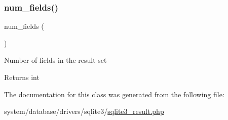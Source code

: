 \subsubsection{\texorpdfstring{num\+\_\+fields()}{num\_fields()}}
{\footnotesize\ttfamily num\+\_\+fields (\begin{DoxyParamCaption}{ }\end{DoxyParamCaption})}

Number of fields in the result set

\begin{DoxyReturn}{Returns}
int 
\end{DoxyReturn}


The documentation for this class was generated from the following file\+:\begin{DoxyCompactItemize}
\item 
system/database/drivers/sqlite3/\mbox{\hyperlink{sqlite3__result_8php}{sqlite3\+\_\+result.\+php}}\end{DoxyCompactItemize}
